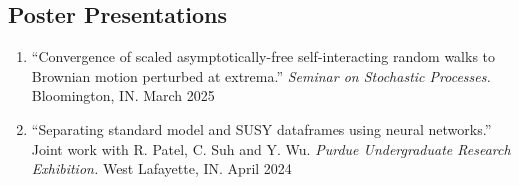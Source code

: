 \documentclass[11pt,letterpaper]{article}
\begin{document}
\subsection*{Poster Presentations}
\begin{enumerate}
    \item {``Convergence of scaled asymptotically-free self-interacting random walks to Brownian motion perturbed at extrema.''}
    \textit{Seminar on Stochastic Processes.} Bloomington, IN. \hfill March 2025

    \item {``Separating standard model and SUSY dataframes using neural networks.''}
    Joint work with R. Patel, C. Suh and Y. Wu.
    \textit{Purdue Undergraduate Research Exhibition.} West Lafayette, IN. \hfill April 2024

\end{enumerate}


\end{document}
